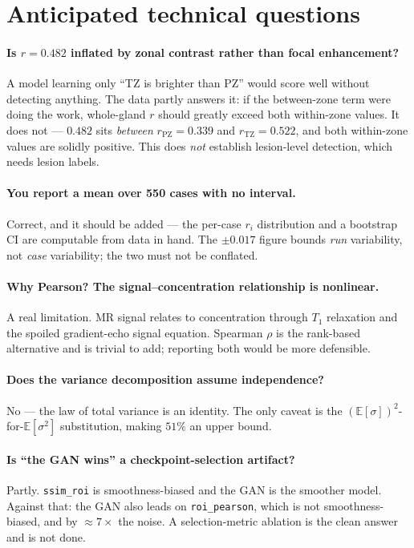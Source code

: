 \documentclass[11pt]{article}
\newcommand{\Ex}{\mathbb{E}}
\newcommand{\1}{\mathbb{1}}
\begin{document}
\section{Anticipated technical questions}

\paragraph{Is $r=0.482$ inflated by zonal contrast rather than focal enhancement?}
A model learning only ``TZ is brighter than PZ'' would score well without detecting anything.
The data partly answers it: if the between-zone term were doing the work, whole-gland $r$
should greatly exceed both within-zone values. It does not --- $0.482$ sits \emph{between}
$r_{\text{PZ}}=0.339$ and $r_{\text{TZ}}=0.522$, and both within-zone values are solidly
positive. This does \emph{not} establish lesion-level detection, which needs lesion labels.

\paragraph{You report a mean over 550 cases with no interval.}
Correct, and it should be added --- the per-case $r_i$ distribution and a bootstrap CI are
computable from data in hand. The $\pm0.017$ figure bounds \emph{run} variability, not
\emph{case} variability; the two must not be conflated.

\paragraph{Why Pearson? The signal--concentration relationship is nonlinear.}
A real limitation. MR signal relates to concentration through $T_1$ relaxation and the
spoiled gradient-echo signal equation. Spearman $\rho$ is the rank-based alternative and is
trivial to add; reporting both would be more defensible.

\paragraph{Does the variance decomposition assume independence?}
No --- the law of total variance is an identity. The only caveat is the
$(\Ex[\sigma])^2$-for-$\Ex[\sigma^2]$ substitution, making $51\%$ an upper bound.

\paragraph{Is ``the GAN wins'' a checkpoint-selection artifact?}
Partly. \texttt{ssim\_roi} is smoothness-biased and the GAN is the smoother model. Against
that: the GAN also leads on \texttt{roi\_pearson}, which is not smoothness-biased, and by
$\approx7\times$ the noise. A selection-metric ablation is the clean answer and is not done.
\end{document}
